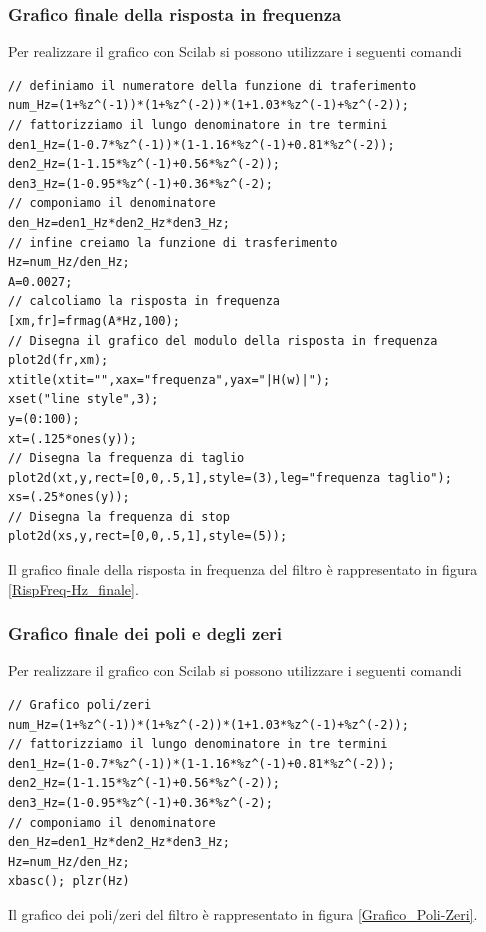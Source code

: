 \subsubsection*{Grafico finale della risposta in frequenza}
Per realizzare il grafico con Scilab si possono utilizzare i seguenti comandi
\begin{verbatim}
// definiamo il numeratore della funzione di traferimento
num_Hz=(1+%z^(-1))*(1+%z^(-2))*(1+1.03*%z^(-1)+%z^(-2));
// fattorizziamo il lungo denominatore in tre termini
den1_Hz=(1-0.7*%z^(-1))*(1-1.16*%z^(-1)+0.81*%z^(-2));
den2_Hz=(1-1.15*%z^(-1)+0.56*%z^(-2));
den3_Hz=(1-0.95*%z^(-1)+0.36*%z^(-2);
// componiamo il denominatore
den_Hz=den1_Hz*den2_Hz*den3_Hz;
// infine creiamo la funzione di trasferimento
Hz=num_Hz/den_Hz;
A=0.0027;
// calcoliamo la risposta in frequenza
[xm,fr]=frmag(A*Hz,100);
// Disegna il grafico del modulo della risposta in frequenza
plot2d(fr,xm);
xtitle(xtit="",xax="frequenza",yax="|H(w)|");
xset("line style",3);
y=(0:100);
xt=(.125*ones(y));
// Disegna la frequenza di taglio
plot2d(xt,y,rect=[0,0,.5,1],style=(3),leg="frequenza taglio");
xs=(.25*ones(y));
// Disegna la frequenza di stop
plot2d(xs,y,rect=[0,0,.5,1],style=(5));
\end{verbatim}
Il grafico finale della risposta in frequenza del filtro \`e rappresentato in figura \ref{RispFreq-Hz_finale}.


\subsubsection*{Grafico finale dei poli e degli zeri}
Per realizzare il grafico con Scilab si possono utilizzare i seguenti comandi
\begin{verbatim}
// Grafico poli/zeri
num_Hz=(1+%z^(-1))*(1+%z^(-2))*(1+1.03*%z^(-1)+%z^(-2)); 
// fattorizziamo il lungo denominatore in tre termini
den1_Hz=(1-0.7*%z^(-1))*(1-1.16*%z^(-1)+0.81*%z^(-2));
den2_Hz=(1-1.15*%z^(-1)+0.56*%z^(-2));
den3_Hz=(1-0.95*%z^(-1)+0.36*%z^(-2);
// componiamo il denominatore 
den_Hz=den1_Hz*den2_Hz*den3_Hz;
Hz=num_Hz/den_Hz;
xbasc(); plzr(Hz)
\end{verbatim}
Il grafico dei poli/zeri del filtro \`e rappresentato in figura \ref{Grafico_Poli-Zeri}.


%

